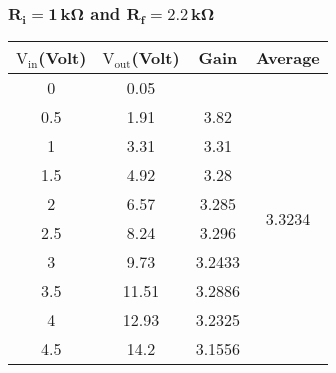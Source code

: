 \documentclass[12pt]{article}
\begin{document}
\subsubsection{$\mathbf{R_i = 1\, k \Omega}$ and $\mathbf{R_f = 2.2\, k \Omega}$}
\begin{table}[H]
	\centering
	\begin{tabular}{|c|c|c|c|}
		\hline
		$\mathrm{V_{in}}$(Volt) & $\mathrm{V_{out}}$(Volt) & Gain             & Average                            \\ \hline \hline
		0            & 0.05          &                  & \multirow{10}{*}{3.3234} 			 \\ \cline{1-3}
		0.5          & 1.91          & 3.82             &                                    \\ \cline{1-3}
		1            & 3.31          & 3.31             &                                    \\ \cline{1-3}
		1.5          & 4.92          & 3.28             &                                    \\ \cline{1-3}
		2            & 6.57          & 3.285            &                                    \\ \cline{1-3}
		2.5          & 8.24          & 3.296            &                                    \\ \cline{1-3}
		3            & 9.73          & 3.2433 			&                                    \\ \cline{1-3}
		3.5          & 11.51         & 3.2886 			&                                    \\ \cline{1-3}
		4            & 12.93         & 3.2325           &                                    \\ \cline{1-3}
		4.5          & 14.2          & 3.1556 			&                                    \\ \hline
	\end{tabular}
\end{table}
\end{document}
